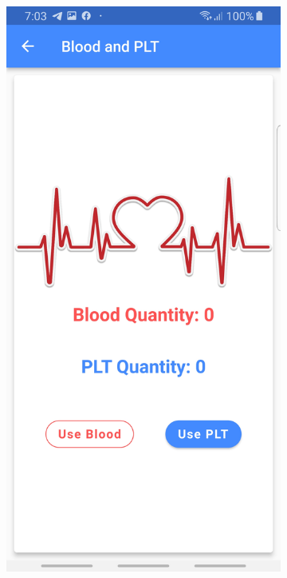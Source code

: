 \begin{figure}[H]
\begin{subfigure}{.31\textwidth}
  \centering
  \includegraphics[width=1\linewidth]{images1/stocke.jpg} 

\end{subfigure}
\end{figure}
